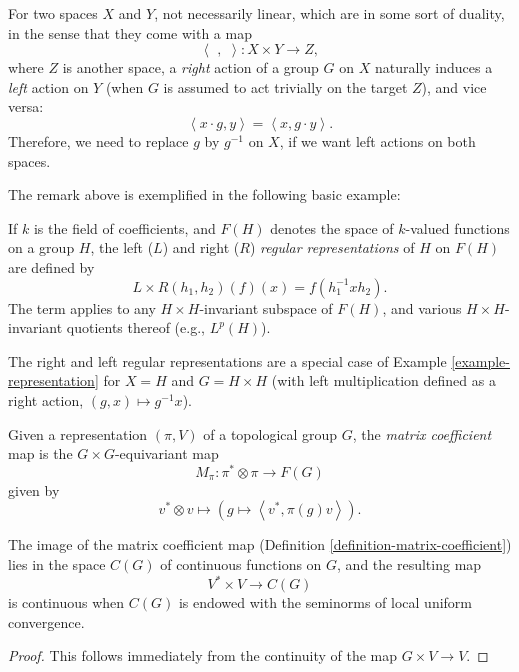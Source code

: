 \begin{remark}
\label{remark-spaces-induality}
 For two spaces $X$ and $Y$, not necessarily linear, which are in some sort of duality, in the sense that they come with a map 
 $$\left < \,\, , \,\, \right> : X\times Y\to Z,$$ 
 where $Z$ is another space, a \emph{right} action of a group $G$ on $X$ naturally induces a \emph{left} action on $Y$ (when $G$ is assumed to act trivially on the target $Z$), and vice versa:
 $$  \left < x\cdot g, y \right> = \left < x, g\cdot y \right>.$$
 Therefore, we need to replace $g$ by $g^{-1}$ on $X$, if we want left actions on both spaces.
\end{remark}

The remark above is exemplified in the following basic example:

\begin{definition}
 \label{definition-regular-representation}
If $k$ is the field of coefficients, and $F(H)$ denotes the space of $k$-valued functions on a group $H$, the left ($L$) and right ($R$) {\it regular representations} of $H$ on $F(H)$ are defined by 
$$ L \times R (h_1, h_2) (f) (x) = f(h_1^{-1} x h_2).$$
The term applies to any $H\times H$-invariant subspace of $F(H)$, and various $H\times H$-invariant quotients thereof (e.g., $L^p(H)$). 
\end{definition}

The right and left regular representations are a special case of Example \ref{example-representation} for $X=H$ and $G=H\times H$ (with left multiplication defined as a right action, $(g,x)\mapsto g^{-1}x$).

\begin{definition}
\label{definition-matrix-coefficient}
Given a representation $(\pi, V)$ of a topological group $G$, the {\it matrix coefficient} map is the $G\times G$-equivariant map 
$$M_\pi: \pi^* \otimes \pi \to F(G)$$
given by 
$$ v^*\otimes v \mapsto \left(g \mapsto \left < v^*, \pi(g) v\right> \right).$$
\end{definition}

\begin{lemma}
\label{lemma-matrixcoefficient-continuous}
The image of the matrix coefficient map (Definition \ref{definition-matrix-coefficient}) lies in the space $C(G)$ of continuous functions on $G$, and the resulting map 
$$ V^* \times V \to C(G)$$
is continuous when $C(G)$ is endowed with the seminorms of local uniform convergence.
\end{lemma}

\begin{proof}
 This follows immediately from the continuity of the map $G\times V\to V$.
\end{proof}


